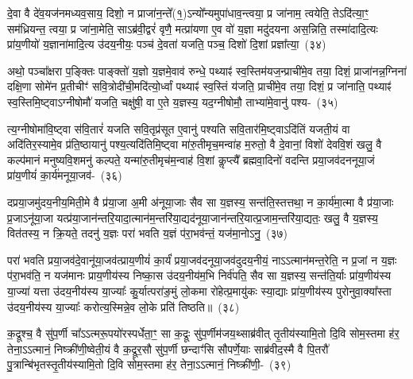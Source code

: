 दे॒वा वै दे॑व॒यज॑नमध्यव॒साय॒ दिशो॒ न प्राजा॑न॒न्ते᳚(१॒)\-ऽन्यो᳚न्यमुपा॑धाव॒न्त्वया॒ प्र जा॑नाम॒ त्वयेति॒ ते\-ऽदि॑त्या॒ꣳ॒ सम॑ध्रियन्त॒ त्वया॒ प्र जा॑ना॒मेति॒ साऽब्र॑वी॒द्वरं॑ वृणै॒ मत्प्रा॑यणा ए॒व वो॑ य॒ज्ञा मदु॑दयना अस॒न्निति॒ तस्मा॑दादि॒त्यः प्रा॑य॒णीयो॑ य॒ज्ञाना॑मादि॒त्य उ॑दय॒नीयः॒ पञ्च॑ दे॒वता॑ यजति॒ पञ्च॒ दिशो॑ दि॒शां प्रज्ञा᳚त्या॒~(३४)\ip

अथो॒ पञ्चा᳚क्षरा प॒ङ्क्तिः पाङ्क्तो॑ य॒ज्ञो य॒ज्ञमे॒वाव॑ रुन्धे॒ पथ्याꣴ॑ स्व॒स्तिम॑यज॒न्प्राची॑मे॒व तया॒ दिशं॒ प्राजा॑नन्न॒ग्निना॑ दक्षि॒णा सोमे॑न प्र॒तीचीꣳ॑ सवि॒त्रोदी॑ची॒मदि॑त्यो॒र्ध्वां पथ्याꣴ॑ स्व॒स्तिं य॑जति॒ प्राची॑मे॒व तया॒ दिशं॒ प्र जा॑नाति॒ पथ्याꣴ॑ स्व॒स्तिमि॒ष्ट्वा\-ऽग्नी\-षोमौ॑ यजति॒ चक्षु॑षी॒ वा ए॒ते य॒ज्ञस्य॒ यद॒ग्नी\-षोमौ॒ ताभ्या॑मे॒वानु॑ पश्य-~(३५)\ip

त्य॒ग्नी\-षोमा॑वि॒ष्ट्वा स॑वि॒तारं॑ यजति सवि॒तृप्र॑सूत ए॒वानु॑ पश्यति सवि॒तार॑मि॒ष्ट्वा\-ऽदि॑तिं यजती॒यं वा अदि॑तिर॒स्यामे॒व प्र॑ति॒ष्ठायानु॑ पश्य॒त्यदि॑तिमि॒ष्ट्वा मा॑रु॒तीमृच॒मन्वा॑ह म॒रुतो॒ वै दे॒वानां॒ विशो॑ देववि॒शं खलु॒ वै कल्प॑मानं मनुष्यवि॒श\-मनु॑ कल्पते॒ यन्मा॑रु॒तीमृच॑म॒न्वाह॑ वि॒शां कॢप्त्यै᳚ ब्रह्मवा॒दिनो॑ वदन्ति प्रया॒जव॑दननूया॒जं प्रा॑य॒णीयं॑ का॒र्य॑मनूया॒जव॑-~(३६)\ip

दप्रया॒जमु॑दय॒नीय॒मिती॒मे वै प्र॑या॒जा अ॒मी अ॑नूया॒जाः सैव सा य॒ज्ञस्य॒ सन्त॑ति॒स्तत्तथा॒ न का॒र्य॑मा॒त्मा वै प्र॑या॒जाः प्र॒जा\-ऽनू॑या॒जा यत्प्र॑या॒जान॑न्तरि॒या\-दा॒त्मान॑\-म॒न्तरि॑या॒द्यद॑नू\-या॒जान॑न्तरि॒यात्प्र॒जाम॒न्तरि॑या॒द्यतः॒ खलु॒ वै य॒ज्ञस्य॒ वित॑तस्य॒ न क्रि॒यते॒ तदनु॑ य॒ज्ञः परा॑ भवति य॒ज्ञं प॑रा॒भव॑न्तं॒ यज॑मा॒नो\-ऽनु॒~(३७)\ip

परा॑ भवति प्रया॒जव॑दे॒वानू॑या॒जव॑त्प्राय॒णीयं॑ का॒र्यं॑ प्रया॒जव॑दनूया॒जव॑दुदय॒नीयं॒ ना\-ऽऽत्मान॑मन्त॒रेति॒ न प्र॒जां न य॒ज्ञः प॑रा॒भव॑ति॒ न यज॑मानः प्राय॒णीय॑स्य निष्का॒स उ॑दय॒नीय॑म॒भि निर्व॑पति॒ सैव सा य॒ज्ञस्य॒ सन्त॑ति॒र्याः प्रा॑य॒णीय॑स्य या॒ज्या॑ यत्ता उ॑दय॒नीय॑स्य या॒ज्याः᳚ कु॒र्यात्परा॑ङ॒मुं लो॒कमा रो॑हेत्प्र॒मायु॑कः स्या॒द्याः प्रा॑य॒णीय॑स्य पुरोनुवा॒क्या᳚स्ता उ॑दय॒नीय॑स्य या॒ज्याः᳚ करोत्य॒स्मिन्ने॒व लो॒के प्रति॑ तिष्ठति॥~(३८)\ip

{\anuvakamend[{प्रज्ञा᳚त्यै पश्यत्यनूया॒जव॒द्यज॑मा॒नो\-ऽनु॑ पुरोनुवा॒क्या᳚स्ता अ॒ष्टौ च॑}]}

क॒द्रूश्च॒ वै सु॑प॒र्णी चा᳚\-ऽऽत्मरू॒पयो॑रस्पर्धेता॒ꣳ॒ सा क॒द्रूः सु॑प॒र्णीम॑जय॒थ्साब्र॑वीत् तृ॒तीय॑स्यामि॒तो दि॒वि सोम॒स्तमा ह॑र॒ तेना॒\-ऽऽ\-त्मानं॒ निष्क्री॑णी॒ष्वेती॒यं वै क॒द्रूर॒सौ सु॑प॒र्णी छन्दाꣳ॑सि सौपर्णे॒याः साब्र॑वीद॒स्मै वै पि॒तरौ॑ पु॒त्रान्बि॑भृतस्तृ॒तीय॑स्यामि॒तो दि॒वि सोम॒स्तमा ह॑र॒ तेना॒\-ऽऽ\-त्मानं॒ निष्क्री॑णी॒-~(३९)\ip

